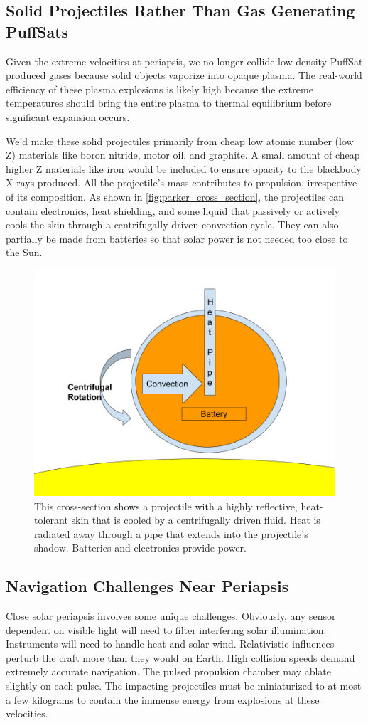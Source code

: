 \documentclass{article}
\begin{document}
{\subsection{Solid Projectiles Rather Than Gas Generating PuffSats}\label{sec:solid_PuffSats}
Given the extreme velocities at periapsis, we no longer collide low density PuffSat produced gases because solid objects vaporize into opaque plasma.   The real-world efficiency of these plasma explosions is likely high because the extreme temperatures should bring the entire plasma to thermal equilibrium before significant expansion occurs.

We'd make these solid projectiles primarily from cheap low atomic number (low Z) materials like boron nitride, motor oil, and graphite.  A small amount of cheap higher Z materials like iron would be included to ensure opacity to the blackbody X-rays produced.  
All the projectile's mass contributes to propulsion, irrespective of its composition.  As shown in \autoref{fig:parker_cross_section}, the projectiles can contain electronics, heat shielding, and some liquid that passively or actively cools the skin through a centrifugally driven convection cycle.     They can also partially be made from batteries so that solar power is not needed too close to the Sun.    

\begin{figure}
    \centering
    \includegraphics[width=0.5\linewidth]{images/Parker Projectile Cross Section.png}
    \caption{This cross-section shows a projectile with a highly reflective, heat-tolerant skin that is cooled by a centrifugally driven fluid. Heat is radiated away through a pipe that extends into the projectile's shadow. Batteries and electronics provide power.}
    \label{fig:parker_cross_section}
\end{figure}

\subsection{Navigation Challenges Near Periapsis}\label{sec:periapsis_challenges}
Close solar periapsis involves some unique challenges.   Obviously, any sensor dependent on visible light will need to filter interfering solar illumination.   Instruments will need to handle heat and solar wind.  Relativistic influences perturb the craft more than they would on Earth.  High collision speeds demand extremely accurate navigation.   The pulsed propulsion chamber may ablate slightly on each pulse.  The impacting projectiles must be miniaturized to at most a few kilograms to contain the immense energy from explosions at these velocities. 

}
\end{document}
